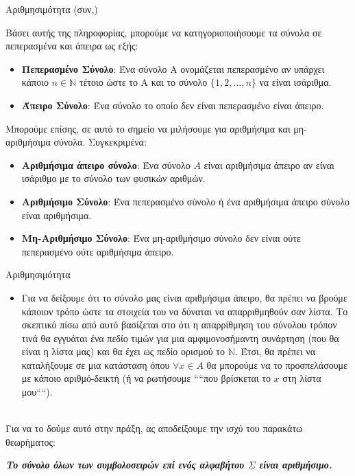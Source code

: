 \documentclass[size=14pt, paper=smartboard, style=fyma, mode=present]{powerdot}
\begin{document}
\begin{slide}[toc={Έννοιες στη Θεωρία Υπολογισμού $IV$}]{Αριθμησιμότητα (συν,)}
{\large 	Βάσει αυτής της πληροφορίας, μπορούμε να κατηγοριοποιήσουμε τα σύνολα σε πεπερασμένα και άπειρα ως εξής:
	\begin{itemize}
		\item \textbf{Πεπερασμένο Σύνολο}: Ένα σύνολο Α ονομάζεται πεπερασμένο αν υπάρχει κάποιο $n \in \mathbb{N}$ τέτοιο ώστε το Α και το σύνολο $\{1,2,...,n\}$ να είναι ισάριθμα.
		\item \textbf{Άπειρο Σύνολο}: Ένα σύνολο το οποίο δεν είναι πεπερασμένο είναι άπειρο.
	\end{itemize} \pause
	Μπορούμε επίσης, σε αυτό το σημείο να μιλήσουμε για αριθμήσιμα και μη-αριθμήσιμα σύνολα. Συγκεκριμένα:
	\begin{itemize}
		\item \textbf{Αριθμήσιμα άπειρο σύνολο}: Ένα σύνολο $Α$ είναι αριθμήσιμα άπειρο αν είναι ισάριθμο με το σύνολο των φυσικών αριθμών.
		\item \textbf{Αριθμήσιμο Σύνολο}: Ένα πεπερασμένο σύνολο ή ένα αριθμήσιμα άπειρο σύνολο είναι αριθμήσιμα.
		\item \textbf{Μη-Αριθμήσιμο Σύνολο}: Ένα μη-αριθμήσιμο σύνολο δεν είναι ούτε πεπερασμένο ούτε αριθμήσιμα άπειρο.
	\end{itemize} 
	}
\end{slide}
\begin{slide}[toc=]{Αριθμησιμότητα}
{\large 	
	
	\begin{itemize}
		\item Για να δείξουμε ότι το σύνολο μας είναι αριθμήσιμα άπειρο, θα πρέπει να βρούμε κάποιον τρόπο ώστε τα στοιχεία του να δύναται να απαρριθμηθούν σαν λίστα. Το σκεπτικό πίσω από αυτό βασίζεται στο ότι η απαρρίθμηση του σύνολου τρόπον τινά θα εγγυάται ένα πεδίο τιμών για μια αμφιμονοσήμαντη συνάρτηση (που θα είναι η λίστα μας) και θα έχει ως πεδίο ορισμού το $\mathbb{N}$. Έτσι, θα πρέπει να καταλήξουμε σε μια κατάσταση όπου $\forall x \in A$ θα μπορούμε να το προσπελάσουμε με κάποιο αριθμό-δεικτή (ή να ρωτήσουμε ````που βρίσκεται το $x$ στη λίστα μου````).
			\end{itemize}
			~\\
Για να το δούμε αυτό στην πράξη, ας αποδείξουμε την ισχύ του παρακάτω θεωρήματος:
\begin{center}
\textbf{	\textit{Το σύνολο όλων των συμβολοσειρών επί ενός αλφαβήτου $\Sigma$ είναι αριθμήσιμο.}}
\end{center}
}
\end{slide}
\end{document}
